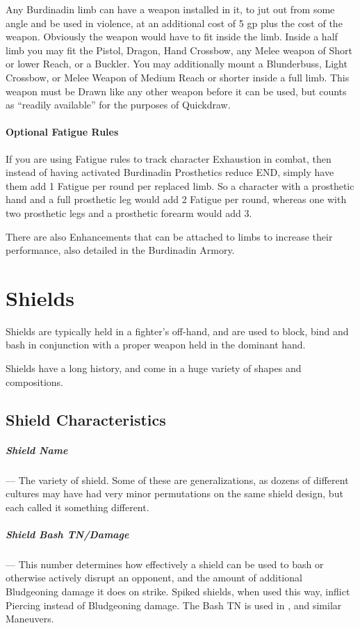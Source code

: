\documentclass[oneside,11pt,english]{book}
\begin{document}
Any Burdinadin limb can have a weapon installed in it, to jut out from some
angle and be used in violence, at an additional cost of 5 gp plus the cost of
the weapon. Obviously the weapon would have to fit inside the limb. Inside a
half limb you may fit the Pistol, Dragon, Hand Crossbow, any Melee weapon of
Short or lower Reach, or a Buckler. You may additionally mount a Blunderbuss,
Light Crossbow, or Melee Weapon of Medium Reach or shorter inside a full limb.
This weapon must be Drawn like any other weapon before it can be used, but
counts as “readily available” for the purposes of Quickdraw.

\subsubsection{Optional Fatigue Rules}
If you are using Fatigue rules to track character Exhaustion in combat, then
instead of having activated Burdinadin Prosthetics reduce END, simply have them
add 1 Fatigue per round per replaced limb. So a character with a prosthetic hand
and a full prosthetic leg would add 2 Fatigue per round, whereas one with two
prosthetic legs and a prosthetic forearm would add 3.

There are also Enhancements that can be attached to limbs to increase their performance, also detailed in 
the Burdinadin Armory. 
\chapter{Shields}\label{ch:Shields}
\startcontents[chapters]
\newpage
Shields are typically held in a fighter’s off-hand, and are used to block, bind and bash in conjunction with 
a proper weapon held in the dominant hand. 

Shields have a long history, and come in a huge variety of shapes and compositions.

\section{Shield Characteristics}
\paragraph{Shield Name}---\quad
The variety of shield. Some of these are generalizations, as dozens of different cultures may have had 
very minor permutations on the same shield design, but each called it something different. 


\vspace{-10pt}\paragraph{Shield Bash TN/Damage}---\quad
This number determines how effectively a shield can be used to bash or otherwise
actively disrupt an opponent, and the amount of additional Bludgeoning damage it
does on strike. Spiked shields, when used this way, inflict Piercing instead of
Bludgeoning damage. The Bash TN is used in , and
similar Maneuvers. 
\end{document}
